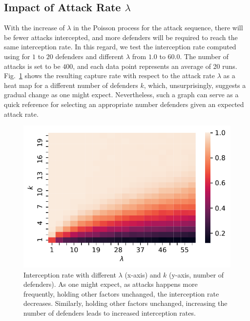 \subsection{Impact of Attack Rate $\lambda$}
With the increase of $\lambda$ in the Poisson process for the attack sequence, 
there will be fewer attacks intercepted, 
and more defenders will be required to reach the same interception rate. 
In this regard, we test the interception rate computed using \ours for $1$ to $20$ defenders and different $\lambda$ from $1.0$ to $60.0$. 
The number of attacks is set to be $400$, and each data point represents an average of 20 runs.
Fig.~\ref{fig:lambda} shows the resulting capture rate with respect to the attack rate $\lambda$ as a heat map for a different number of defenders $k$, which, unsurprisingly, suggests a gradual change as one might expect. Nevertheless, such a graph can serve as a quick reference for selecting an appropriate number defenders given an expected attack rate.

\begin{figure}[h!]
    \vspace{-2mm}
    \centering
    \includegraphics[width=0.9\linewidth]{chapters/pd/fig/lambda.pdf}
    \vspace{-2mm}
    \caption{Interception rate with different $\lambda$ (x-axis) and $k$ (y-axis, number of defenders). As one might expect, as attacks happens more frequently, holding other factors unchanged, the interception rate decreases. Similarly, holding other factors unchanged, increasing the number of defenders leads to increased interception rates.}
    \label{fig:lambda}
    \vspace{-2mm}
\end{figure}

